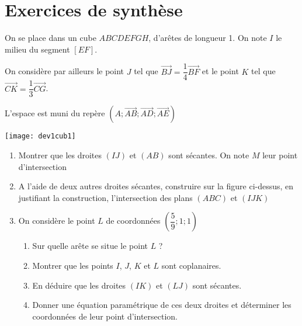 \documentclass[11pt,fleqn, openany]{book} %
\begin{document}

\section*{Exercices de synthèse}


\begin{exercise}[topic=geo05]\hspace{0pt}

\begin{minipage}{0.6\linewidth}On se place dans un cube $ABCDEFGH$, d'arêtes de longueur 1.
On note $I$ le milieu du segment $[EF]$.

On considère par ailleurs le point $J$ tel que $\overrightarrow{BJ}=\dfrac{1}{4}\overrightarrow{BF}$ et le point $K$ tel que $\overrightarrow{CK}=\dfrac{1}{3}\overrightarrow{CG}$. 

L'espace est muni du repère $(A;\overrightarrow{AB};\overrightarrow{AD};\overrightarrow{AE})$
\end{minipage}\hfill\begin{minipage}{0.35\linewidth}
\begin{center}
\texttt{[image: dev1cub1]}
\end{center}

\end{minipage}

\vskip80pt
\begin{enumerate}
\item Montrer que les droites $(IJ)$ et $(AB)$ sont sécantes. On note $M$ leur point d'intersection
\item A l'aide de deux autres droites sécantes, construire sur la figure ci-dessus, en justifiant la construction, l'intersection des plans $(ABC)$ et $(IJK)$
\item On considère le point $L$ de coordonnées $\left(\dfrac{5}{9};1;1\right)$
\begin{enumerate}
\item Sur quelle arête se situe le point $L$ ?
\item Montrer que les points $I$, $J$, $K$ et $L$ sont coplanaires.
\item En déduire que les droites $(IK)$ et $(LJ)$ sont sécantes.
\item Donner une équation paramétrique  de ces deux droites et déterminer les coordonnées de leur point d'intersection.
\end{enumerate}
\end{enumerate}\end{exercise}
\end{document}
